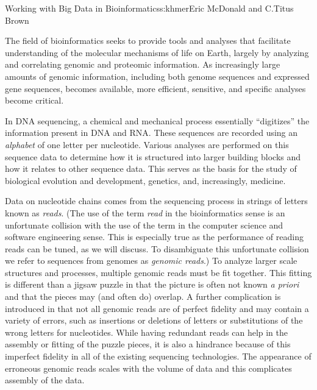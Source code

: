 \begin{aosachapter}{Working with Big Data in Bioinformatics}{s:khmer}{Eric McDonald and C.\/Titus Brown}



The field of bioinformatics seeks to provide tools and analyses that
facilitate understanding of the molecular mechanisms of life on Earth,
largely by analyzing and correlating genomic and proteomic information.
As increasingly large amounts of genomic information, including both
genome sequences and expressed gene sequences, becomes available, more
efficient, sensitive, and specific analyses become critical.

In DNA sequencing, a chemical and mechanical process essentially
``digitizes'' the information present in DNA and RNA. These sequences
are recorded using an \emph{alphabet} of one letter per nucleotide.
Various analyses are performed on this sequence data to determine how it
is structured into larger building blocks and how it relates to other
sequence data. This serves as the basis for the study of biological
evolution and development, genetics, and, increasingly, medicine.

Data on nucleotide chains comes from the sequencing process in strings
of letters known as \emph{reads}. (The use of the term \emph{read} in
the bioinformatics sense is an unfortunate collision with the use of the
term in the computer science and software engineering sense. This is
especially true as the performance of reading reads can be tuned, as we
will discuss. To disambiguate this unfortunate collision we refer to
sequences from genomes as \emph{genomic reads}.) To analyze larger scale
structures and processes, multiple genomic reads must be fit together.
This fitting is different than a jigsaw puzzle in that the picture is
often not known \emph{a priori} and that the pieces may (and often do)
overlap. A further complication is introduced in that not all genomic
reads are of perfect fidelity and may contain a variety of errors, such
as insertions or deletions of letters or substitutions of the wrong
letters for nucleotides. While having redundant reads can help in the
assembly or fitting of the puzzle pieces, it is also a hindrance because
of this imperfect fidelity in all of the existing sequencing
technologies. The appearance of erroneous genomic reads scales with the
volume of data and this complicates assembly of the data.


\end{aosachapter}

